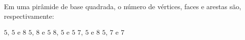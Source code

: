 Em uma pirâmide de base quadrada, o número de vértices, faces e arestas são, respectivamente:

$5$, $5$ e $8$
$5$, $8$ e $5$
$8$, $5$ e $5$
$7$, $5$ e $8$
$5$, $7$ e $7$


